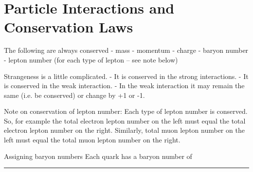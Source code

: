 \documentclass{report}
\begin{document}
\section*{\textcolor{ProcessBlue}{Particle Interactions and Conservation Laws}}

The following are always conserved
- mass
- momentum
- charge
- baryon number
- lepton number (for each type of lepton -- see note below)

Strangeness is a little complicated.
- It is conserved in the strong interactions.
- It is conserved in the weak interaction.
- In the weak interaction it may remain the same (i.e. be conserved) or change by +1 or -1.

Note on conservation of lepton number:
Each type of lepton number is conserved. So, for example the total electron lepton number on the left must equal the total electron lepton number on the right. Similarly, total muon lepton number on the left must equal the total muon lepton number on the right.

Assigning baryon numbers
Each quark has a baryon number of 

{\color{RubineRed} \rule{\linewidth}{0.5mm} }
 
\end{document}
